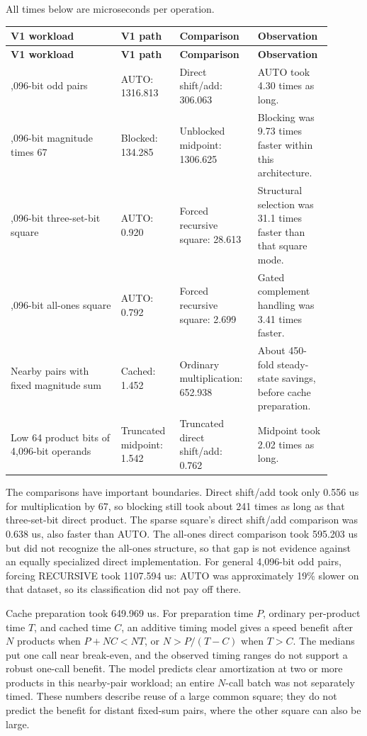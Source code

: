 \documentclass[11pt,a4paper]{article}
\begin{document}
All times below are microseconds per operation.

\begingroup
\small
\setlength{\tabcolsep}{4pt}
\begin{longtable}{>{\raggedright\arraybackslash}p{0.32\linewidth}>{\raggedright\arraybackslash}p{0.17\linewidth}>{\raggedright\arraybackslash}p{0.22\linewidth}>{\raggedright\arraybackslash}p{0.19\linewidth}}
\toprule
\textbf{V1 workload} & \textbf{V1 path} & \textbf{Comparison} & \textbf{Observation} \\
\midrule
\endfirsthead
\toprule
\textbf{V1 workload} & \textbf{V1 path} & \textbf{Comparison} & \textbf{Observation} \\
\midrule
\endhead
\bottomrule
\endfoot
4,096-bit odd pairs & AUTO: 1316.813 & Direct shift/add: 306.063 & AUTO took 4.30 times as long. \\
4,096-bit magnitude times 67 & Blocked: 134.285 & Unblocked midpoint: 1306.625 & Blocking was 9.73 times faster within this architecture. \\
4,096-bit three-set-bit square & AUTO: 0.920 & Forced recursive square: 28.613 & Structural selection was 31.1 times faster than that square mode. \\
4,096-bit all-ones square & AUTO: 0.792 & Forced recursive square: 2.699 & Gated complement handling was 3.41 times faster. \\
Nearby pairs with fixed magnitude sum & Cached: 1.452 & Ordinary multiplication: 652.938 & About 450-fold steady-state savings, before cache preparation. \\
Low 64 product bits of 4,096-bit operands & Truncated midpoint: 1.542 & Truncated direct shift/add: 0.762 & Midpoint took 2.02 times as long. \\
\end{longtable}
\endgroup

The comparisons have important boundaries. Direct shift/add took only 0.556 us for multiplication by 67, so blocking still took about 241 times as long as that three-set-bit direct product. The sparse square's direct shift/add comparison was 0.638 us, also faster than AUTO. The all-ones direct comparison took 595.203 us but did not recognize the all-ones structure, so that gap is not evidence against an equally specialized direct implementation. For general 4,096-bit odd pairs, forcing RECURSIVE took 1107.594 us: AUTO was approximately 19\% slower on that dataset, so its classification did not pay off there.

Cache preparation took 649.969 us. For preparation time $P$, ordinary per-product time $T$, and cached time $C$, an additive timing model gives a speed benefit after $N$ products when $P+NC<NT$, or $N>P/(T-C)$ when $T>C$. The medians put one call near break-even, and the observed timing ranges do not support a robust one-call benefit. The model predicts clear amortization at two or more products in this nearby-pair workload; an entire $N$-call batch was not separately timed. These numbers describe reuse of a large common square; they do not predict the benefit for distant fixed-sum pairs, where the other square can also be large.
\end{document}
